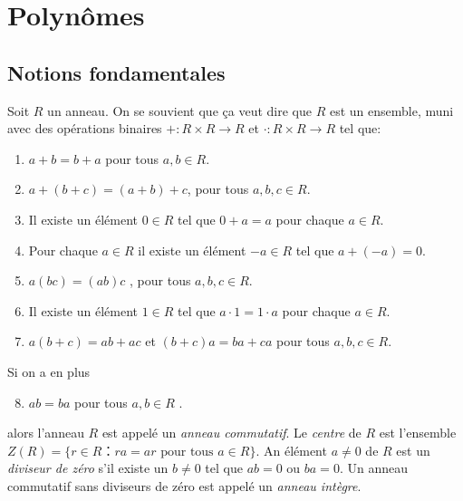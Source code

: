 
\chapter{Polynômes}
\label{cha:polynomes}

\section{Notions fondamentales}
\label{sec:noti-fond}


Soit $R$ un anneau. On se souvient que ça veut dire que  $R$ est un ensemble,  muni avec des opérations binaires  $+ : R × R → R$  et $⋅: R × R → R$ tel que: 
\begin{enumerate}[(R1)]
\item $a+ b  = b+a$ pour tous     $a,b ∈ R$. \label{R1}
\item $a + (b+c) = (a + b) +c$, pour tous $a,b,c ∈ R$. \label{R2}
\item Il existe un élément $0 ∈R$ tel que $0+a =a$ pour chaque $a ∈R$. \label{R3}
\item Pour chaque $a ∈R$ il existe un élément $-a ∈R$ tel que $a + (-a) = 0$. \label{R4}
\item $a(bc) = (ab) c$ , pour tous $a,b,c ∈ R$. \label{R5}
\item Il existe un élément $1 ∈R$ tel que $a ⋅ 1 = 1 ⋅a$ pour chaque $a ∈R$. \label{R6}
\item $a (b+c) = ab + ac$ et $(b+c) a =ba +ca$  pour tous $a,b,c ∈R$.\label{R7} 
\end{enumerate}
Si on a en plus
\begin{enumerate}[(R1)]
  \setcounter{enumi}{7}
\item  $a b = ba$ pour tous $a,b ∈R$ \label{R8}. 
\end{enumerate}
alors l'anneau $R$ est appelé un \emph{anneau commutatif}. Le \emph{centre} de $R$ est l'ensemble $Z(R) = \{ r ∈ R ： ra = ar \text{ pour tous } a ∈ R\}$. 
An élément  $a ≠0$ de $R$ est un \emph{diviseur de zéro} s'il existe un $b≠0$ tel que $ab = 0$ ou $ba = 0$. Un anneau commutatif sans diviseurs de zéro est appelé un \emph{anneau intègre}.  



